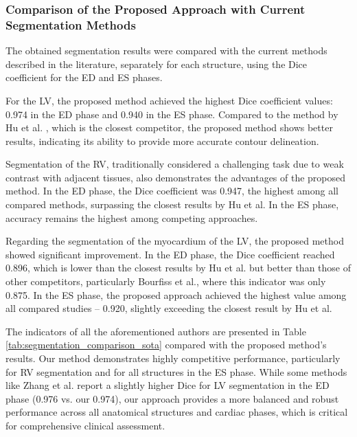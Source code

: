 \documentclass[fleqn,10pt]{wlscirep}
\begin{document}
\subsubsection*{Comparison of the Proposed Approach with Current Segmentation Methods}

The obtained segmentation results were compared with the current methods described in the literature, separately for each structure, using the Dice coefficient for the ED and ES phases.

For the LV, the proposed method achieved the highest Dice coefficient values: 0.974 in the ED phase and 0.940 in the ES phase. Compared to the method by Hu et al. \cite{Hu:2023}, which is the closest competitor, the proposed method shows better results, indicating its ability to provide more accurate contour delineation.

Segmentation of the RV, traditionally considered a challenging task due to weak contrast with adjacent tissues, also demonstrates the advantages of the proposed method. In the ED phase, the Dice coefficient was 0.947, the highest among all compared methods, surpassing the closest results by Hu et al. In the ES phase, accuracy remains the highest among competing approaches.

Regarding the segmentation of the myocardium of the LV, the proposed method showed significant improvement. In the ED phase, the Dice coefficient reached 0.896, which is lower than the closest results by Hu et al. but better than those of other competitors, particularly Bourfiss et al., where this indicator was only 0.875. In the ES phase, the proposed approach achieved the highest value among all compared studies – 0.920, slightly exceeding the closest result by Hu et al.

The indicators of all the aforementioned authors are presented in Table \ref{tab:segmentation_comparison_sota} compared with the proposed method’s results. Our method demonstrates highly competitive performance, particularly for RV segmentation and for all structures in the ES phase. While some methods like Zhang et al. \cite{Zhang:2022} report a slightly higher Dice for LV segmentation in the ED phase (0.976 vs. our 0.974), our approach provides a more balanced and robust performance across all anatomical structures and cardiac phases, which is critical for comprehensive clinical assessment.
\end{document}

